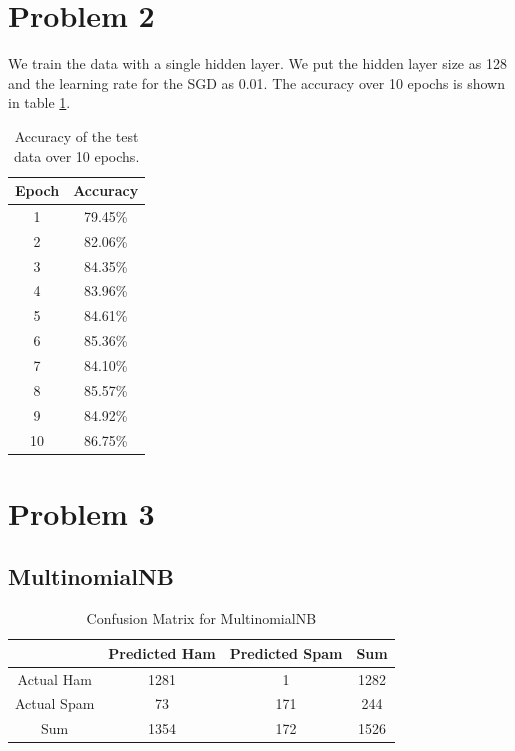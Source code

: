 \documentclass[a4paper]{article}
\begin{document}
\section*{Problem 2}
We train the data with a single hidden layer. We put the hidden layer size as 128 and the learning rate for the SGD as 0.01. The accuracy over 10 epochs is shown in table \ref{tab}.
\begin{table}[h!]
	\centering
	
	\begin{tabular}{|c|c|}
		\hline
		Epoch & Accuracy \\
		\hline
		1 & 79.45\% \\
		\hline
		2 & 82.06\% \\
		\hline
		3 &  84.35\%\\
		\hline
		4 &  83.96\%\\
		\hline
		5 &  84.61\%\\
		\hline
		6 &  85.36\%\\
		\hline
		7 &  84.10\%\\
		\hline
		8 &  85.57\%\\
		\hline
		9 &  84.92\%\\
		\hline
		10 &  86.75\%\\
		\hline
	\end{tabular}
	\caption{Accuracy of the test data over 10 epochs. }
	\label{tab}
\end{table}

\section*{Problem 3}

\subsection*{MultinomialNB}

\begin{table}[h!]
    \centering
    \begin{tabular}{|c|c|c|c|}
        \hline
        & Predicted Ham & Predicted Spam & Sum \\
        \hline
        Actual Ham & 1281 & 1 & 1282 \\
        \hline
        Actual Spam & 73 & 171 & 244 \\
        \hline
        Sum & 1354 & 172 & 1526 \\
        \hline
    \end{tabular}
    \caption{Confusion Matrix for MultinomialNB}
    \label{mNB}
\end{table}
\end{document}
